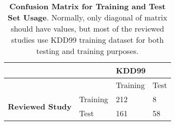 
\begin{table}[!ht]
    \centering 
    \caption{ \textbf{Confusion Matrix for Training and Test Set Usage}. Normally, only  diagonal of matrix should have values, but most of the reviewed studies use KDD99 training dataset for both testing and training purposes. }
    \label{table-metaTrainingTestSetConfusionMatrix}

\begin{tabular}{llll}

\toprule
                                &          & \multicolumn{2}{l}{\textbf{KDD99}} \\
\midrule
                                &          & Training      & Test      \\
\multirow{2}{*}{\textbf{Reviewed Study}} & Training & 212 & 8 \\
                                & Test     & 161 & 58\\
\bottomrule

\end{tabular}
\end{table}
